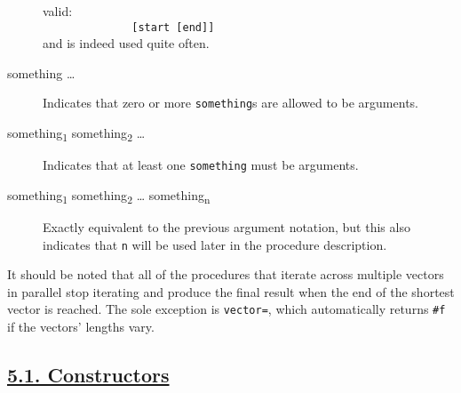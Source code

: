 \begin{description}
valid:\\[2\baselineskip]\texttt{\ \ \ \ \ \ \ \ \ \ \ ~~~{[}start\ {[}end{]}{]}\ \ \ \ \ \ \ \ \ }\\[2\baselineskip]and
is indeed used quite often.\\[2\baselineskip]
\item[something \ldots{}]
Indicates that zero or more \texttt{something}s are allowed to be
arguments.\\[2\baselineskip]
\item[ something\textsubscript{1} something\textsubscript{2} \ldots{} ]
Indicates that at least one \texttt{something} must be
arguments.\\[2\baselineskip]
\item[ something\textsubscript{1} something\textsubscript{2} \ldots{}
something\textsubscript{n} ]
Exactly equivalent to the previous argument notation, but this also
indicates that \texttt{n} will be used later in the procedure
description.\\[2\baselineskip]
\end{description}

It should be noted that all of the procedures that iterate across
multiple vectors in parallel stop iterating and produce the final result
when the end of the shortest vector is reached. The sole exception is
\texttt{vector=}, which automatically returns \texttt{\#f} if the
vectors' lengths vary.

\subsection{\texorpdfstring{\href{}{5.1.
Constructors}}{5.1. Constructors}}\label{constructors}

